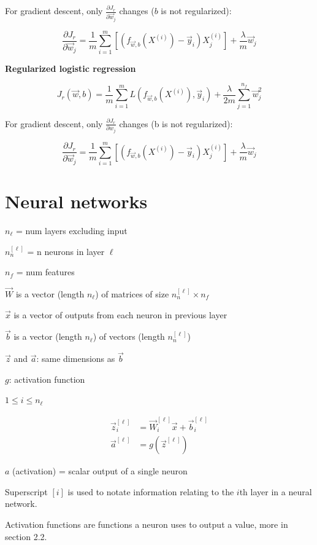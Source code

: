 \documentclass[12pt]{article}
\begin{document}
For gradient descent, only $\frac{\partial J_r}{\partial \vec{w}_j}$ changes ($b$ is not regularized):

\[ \frac{\partial J_r}{\partial \vec{w}_j} = \frac{1}{m} \sum_{i=1}^m \left[(f_{\vec{w},b}(X^{(i)}) - \vec{y}_i)X_j^{(i)}\right] + \frac{\lambda}{m} \vec{w}_j \]

\noindent \textbf{Regularized logistic regression}

\[ J_r(\vec{w},b) = \frac{1}{m} \sum_{i=1}^m L(f_{\vec{w},b}(X^{(i)}), \vec{y}_i) + \frac{\lambda}{2m} \sum_{j=1}^{n_f} \vec{w}_j^2 \]

For gradient descent, only $\frac{\partial J_r}{\partial w_j}$ changes (b is not regularized):

\[ \frac{\partial J_r}{\partial \vec{w}_j} = \frac{1}{m} \sum_{i=1}^m \left[(f_{\vec{w},b}(X^{(i)}) - \vec{y}_i)X_j^{(i)}\right] + \frac{\lambda}{m} \vec{w}_j \]

\pagebreak

\section{Neural networks}

$n_{\ell}$ = num layers excluding input

$n^{[\ell]}_n$ = n neurons in layer $\ell$

$n_f$ = num features

$\vec{W}$ is a vector (length $n_{\ell}$) of matrices of size $n^{[\ell]}_n \times n_f$

$\vec{x}$ is a vector of outputs from each neuron in previous layer

$\vec{b}$ is a vector (length $n_{\ell}$) of vectors (length $n^{[\ell]}_n$)

$\vec{z}$ and $\vec{a}$: same dimensions as $\vec{b}$

$g$: activation function

$1 \leq i \leq n_{\ell}$

\begin{align*}
\vec{z}^{[\ell]}_i &= \vec{W}^{[\ell]}_i \vec{x} + \vec{b}^{[\ell]}_i\\
\vec{a}^{[\ell]} &= g(\vec{z}^{[\ell]})
\end{align*}

$a$ (activation) = scalar output of a single neuron

Superscript $[i]$ is used to notate information relating to the $i$th layer in a neural network.

Activation functions are functions a neuron uses to output a value, more in section 2.2.
\end{document}
